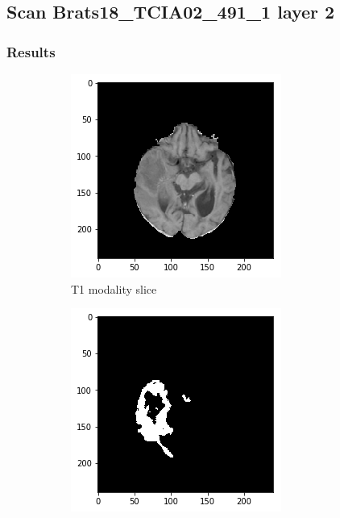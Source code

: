 \subsection{Scan Brats18\_TCIA02\_491\_1 layer 2}
\subsubsection{Results}


\begin{figure}[H]
    \centering
    \begin{subfigure}[t]{.21\textwidth}
        \centering
        \includegraphics[width=\linewidth]{chapters/06_hdm/a_Brats18_TCIA02_491_1_L2/1.png}
        \caption{T1 modality slice}
    \end{subfigure}%
    \begin{subfigure}[t]{.21\textwidth}
        \centering
        \includegraphics[width=\linewidth]{chapters/06_hdm/a_Brats18_TCIA02_491_1_L2/0.png}

\end{subfigure}
\end{figure}
